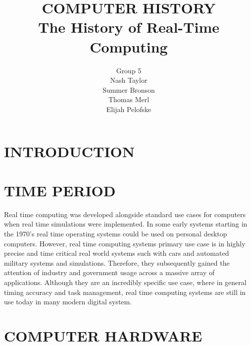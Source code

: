 \documentclass[letterpaper, 10 pt, conference]{IEEEconf}
\title{\LARGE \bf
COMPUTER HISTORY\\
\large The History of Real-Time Computing
}
\author{Group 5\\
\small Nash Taylor\\
\small Summer Bronson\\
\small Thomas Merl\\
\small Elijah Pelofske
}
\begin{document}
\maketitle
\thispagestyle{empty}
\pagestyle{empty}


\section{INTRODUCTION}

\begin{comment}
This document is an example of Assignment 3 in CSE/IT101.
You should describe what topic you chose and
why you chose that topic. Also provide a summary of the
topic, in a general sense. This section should describe any
background information that the reader needs to know to
understand your topic.
\end{comment}

\section{TIME PERIOD}
Real time computing was developed alongside standard use cases for computers when real time simulations were implemented. In some early systems starting in the 1970's real time operating systems could be used on personal desktop computers. However, real time computing systems primary use case is in highly precise and time critical real world systems such with cars and automated military systems and simulations. Therefore, they subsequently gained the attention of industry and government usage across a massive array of applications. Although they are an incredibly specific use case, where in general timing accuracy and task management, real time computing systems are still in use today in many modern digital system.
\begin{comment}
You should describe the time period in which your topic was
invented or used here. Also include the context for why your
topic was created or for how it is used. Any specific historical
information should be included here.
\end{comment}
\section{COMPUTER HARDWARE}
\end{document}
